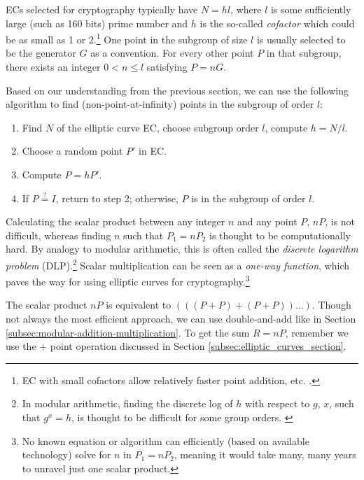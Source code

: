 ECs selected for cryptography typically have $N = hl$, where $l$ is some sufficiently large (such as 160 bits) prime number and $h$ is the so-called {\em cofactor} which could be as small as 1 or 2.\footnote{EC with small cofactors allow relatively faster point addition, etc. \cite{Bernstein2008-twisted-edwards}.} One point in the subgroup of size $l$ is usually selected to be the generator $G$ as a convention. For every other point $P$ in that subgroup, there exists an integer $0 < n \leq l$ satisfying $P = n G$.

Based on our understanding from the previous section, we can use the following algorithm to find (non-point-at-infinity) points in the subgroup of order $l$:
\begin{enumerate}
    \item Find $N$ of the elliptic curve EC, choose subgroup order $l$, compute $h = N/l$.
    \item Choose a random point $P'$ in EC.
    \item Compute $P=h P'$.
    \item If $P \stackrel{?}{=} I$, return to step 2; otherwise, $P$ is in the subgroup of order $l$.
\end{enumerate}

Calculating the scalar product between any integer $n$ and any point $P$, $nP$, is not difficult, whereas finding $n$ such that $P_1 = n P_2$ is thought to be computationally hard. By analogy to modular arithmetic, this is often called the {\em discrete logarithm problem} (DLP).\footnote{In modular arithmetic, finding the discrete log of $h$ with respect to $g$, $x$, such that $g^x = h$, is thought to be difficult for some group orders. \cite{network-security-crash-course-dlp}} Scalar multiplication can be seen as a {\em one-way function}, which paves the way for using elliptic curves for cryptography.\footnote{No known equation or algorithm can efficiently (based on available technology) solve for $n$ in $P_1 = n P_2$, meaning it would take many, many years to unravel just one scalar product.}

The scalar product $nP$ is equivalent to $(((P+P)+(P+P))...)$. Though not always the most efficient approach, we can use double-and-add like in Section \ref{subsec:modular-addition-multiplication}. To get the sum $R = n P$, remember we use the $+$ point operation discussed in Section \ref{subsec:elliptic_curves_section}.

